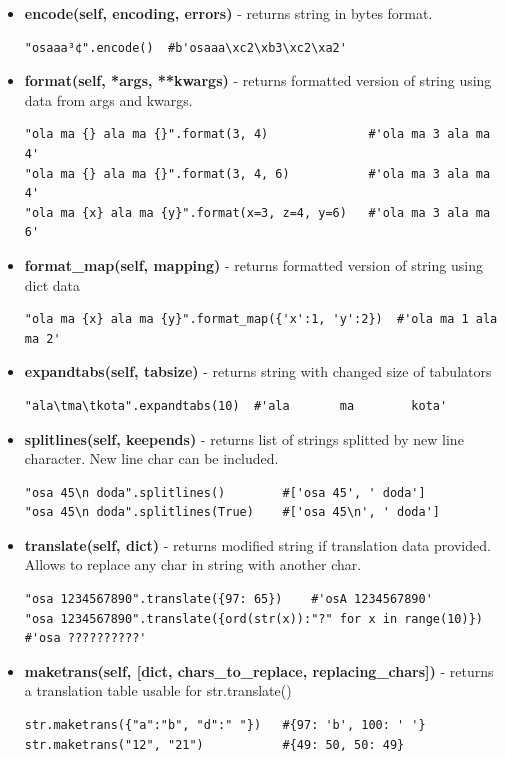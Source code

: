 \documentclass{article}
\begin{document}
\begin{itemize}
\item \textbf{encode(self, encoding, errors)} - returns string in bytes format. 
\begin{lstlisting}[style=pystyle]
"osaaa³¢".encode()	#b'osaaa\xc2\xb3\xc2\xa2'
\end{lstlisting}

\item \textbf{format(self, *args, **kwargs)} - returns formatted version of string using data from args and kwargs.
\begin{lstlisting}[style=pystyle]
"ola ma {} ala ma {}".format(3, 4)				#'ola ma 3 ala ma 4'
"ola ma {} ala ma {}".format(3, 4, 6)			#'ola ma 3 ala ma 4'
"ola ma {x} ala ma {y}".format(x=3, z=4, y=6)	#'ola ma 3 ala ma 6'
\end{lstlisting}

\item \textbf{format\_map(self, mapping)} - returns formatted version of string using dict data
\begin{lstlisting}[style=pystyle]
"ola ma {x} ala ma {y}".format_map({'x':1, 'y':2})	#'ola ma 1 ala ma 2'
\end{lstlisting}

\item \textbf{expandtabs(self, tabsize)} - returns string with changed size of tabulators
\begin{lstlisting}[style=pystyle]
"ala\tma\tkota".expandtabs(10)	#'ala       ma        kota'
\end{lstlisting}

\item \textbf{splitlines(self, keepends)} - returns list of strings splitted by new line character. New line char can be included.
\begin{lstlisting}[style=pystyle]
"osa 45\n doda".splitlines() 		#['osa 45', ' doda']
"osa 45\n doda".splitlines(True) 	#['osa 45\n', ' doda']
\end{lstlisting}

\item \textbf{translate(self, dict)} - returns modified string if translation data provided. Allows to replace any char in string with another char.
\begin{lstlisting}[style=pystyle]
"osa 1234567890".translate({97: 65})	#'osA 1234567890'
"osa 1234567890".translate({ord(str(x)):"?" for x in range(10)})	#'osa ??????????' 
\end{lstlisting}

\item \textbf{maketrans(self, [dict, chars\_to\_replace, replacing\_chars])} - returns a translation table usable for str.translate() 
\begin{lstlisting}[style=pystyle]
str.maketrans({"a":"b", "d":" "})	#{97: 'b', 100: ' '}
str.maketrans("12", "21")			#{49: 50, 50: 49}
\end{lstlisting}


\end{itemize}
\end{document}
